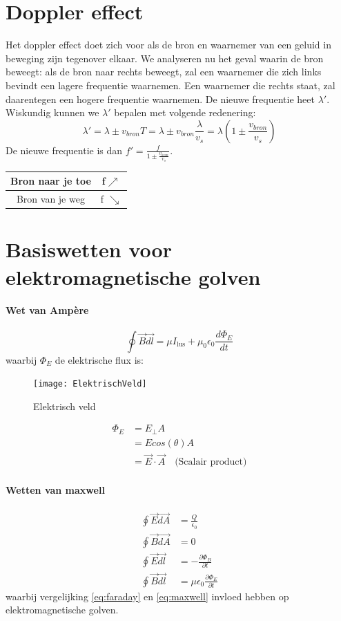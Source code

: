 \documentclass[a4paper,kul]{kulakarticle} %
\begin{document}
\newpage
\section{Doppler effect}
Het doppler effect doet zich voor als de bron en waarnemer van een geluid in beweging zijn tegenover elkaar. We analyseren nu het geval waarin de bron beweegt: als de bron naar rechts beweegt,  zal een waarnemer die zich links bevindt een lagere frequentie waarnemen. Een waarnemer die rechts staat, zal daarentegen een hogere frequentie waarnemen. De nieuwe frequentie heet $\lambda'$. Wiskundig kunnen we $\lambda'$ bepalen met volgende redenering:
\begin{equation*}
	\lambda'=\lambda\pm v_{bron}T=\lambda\pm v_{bron}\frac{\lambda}{v_s}=\lambda(1\pm\frac{v_{bron}}{v_s})
\end{equation*}
De nieuwe frequentie is dan $f'=\frac{f}{1\pm\frac{v_{bron}}{v_s}}$.
\begin{center}
	\begin{tabular}{|c|c|}
		\hline
		Bron naar je toe  & f$\nearrow$ \\
		\hline
		Bron van je weg & f $\searrow$\\
		\hline
	\end{tabular}
	
\end{center}
\newpage
\section{Basiswetten voor elektromagnetische golven}
\paragraph{Wet van Ampère}
\begin{equation*}
	\oint\vec{B}\vec{dl}=\mu I_{\text{lus}}+\mu_0\epsilon_0\frac{d\Phi_E}{dt}
\end{equation*}
waarbij $\Phi_E$ de elektrische flux is:
\begin{figure}[h]
	\centering
	\texttt{[image: ElektrischVeld]}
	\caption[Elektrisch veld]{Elektrisch veld}
	\label{fig:elektrischveld}
\end{figure}
\begin{align*}
	\Phi_E &= E_{\perp}A\\
	&= Ecos(\theta)A\\
	&= \vec{E}\cdot\vec{A}\quad\text{(Scalair product)}
\end{align*}
\paragraph{Wetten van maxwell}
\begin{align}
	\oint\vec{E}\vec{dA}&=\frac{Q}{\epsilon_0}\\
	\oint\vec{B}\vec{dA}&=0\\
	\label{eq:faraday}
	\oint\vec{E}\vec{dl}&=-\frac{\partial\Phi_B}{\partial t}\\
	\label{eq:maxwell}
	\oint\vec{B}\vec{dl}&=\mu\epsilon_0\frac{\partial\Phi_E}{\partial t}
\end{align}
waarbij vergelijking \ref{eq:faraday} en \ref{eq:maxwell} invloed hebben op elektromagnetische golven.
\newpage
\end{document}
